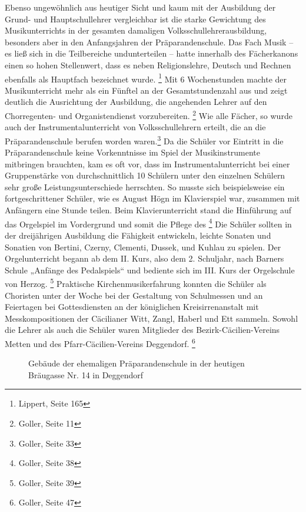 Ebenso ungewöhnlich aus heutiger Sicht und kaum mit der Ausbildung der
Grund- und Hauptschullehrer vergleichbar ist die starke Gewichtung des
Musikunterrichts in der gesamten damaligen Volksschullehrerausbildung,
besonders aber in den Anfangsjahren der Präparandenschule. Das Fach
Musik – es ließ sich in die Teilbereiche undunterteilen – hatte innerhalb des Fächerkanons einen so hohen
Stellenwert, dass es neben Religionslehre, Deutsch und Rechnen
ebenfalls als Hauptfach bezeichnet wurde. \footnote{Lippert, Seite 165}
Mit 6 Wochenstunden machte der Musikunterricht mehr als ein Fünftel an
der Gesamtstundenzahl aus und zeigt deutlich die Ausrichtung der
Ausbildung, die angehenden Lehrer auf den Chorregenten- und
Organistendienst vorzubereiten. \footnote{Goller, Seite 11} Wie alle
Fächer, so wurde auch der Instrumentalunterricht von Volksschullehrern
erteilt, die an die Präparandenschule berufen worden waren.\footnote{
Goller, Seite 33} Da die Schüler vor Eintritt in die Präparandenschule
keine Vorkenntnisse im Spiel der Musikinstrumente mitbringen brauchten,
kam es oft vor, dass im Instrumentalunterricht bei einer Gruppenstärke
von durchschnittlich 10 Schülern unter den einzelnen Schülern sehr
große Leistungsunterschiede herrschten. So musste sich beispielsweise
ein fortgeschrittener Schüler, wie es August Högn im Klavierspiel war,
zusammen mit Anfängern eine Stunde teilen. Beim Klavierunterricht stand
die Hinführung auf das Orgelspiel im Vordergrund und somit die Pflege
des   \footnote{Goller, Seite 38}
Die Schüler sollten in der dreijährigen Ausbildung die Fähigkeit
entwickeln, leichte Sonaten und Sonatien von Bertini, Czerny, Clementi,
Dussek, und Kuhlau zu spielen. Der Orgelunterricht begann ab dem II.
Kurs, also dem 2. Schuljahr, nach Barners Schule „Anfänge des
Pedalspiels“ und bediente sich im III. Kurs der Orgelschule von
Herzog. \footnote{Goller, Seite 39} Praktische Kirchenmusikerfahrung
konnten die Schüler als Choristen unter der Woche bei der Gestaltung
von Schulmessen und an Feiertagen bei Gottesdiensten an der königlichen
Kreisirrenanstalt mit Messkompositionen der Cäcilianer Witt, Zangl,
Haberl und Ett sammeln. Sowohl die Lehrer als auch die Schüler waren
Mitglieder des Bezirk-Cäcilien-Vereins Metten und des
Pfarr-Cäcilien-Vereins Deggendorf. \footnote{Goller, Seite 47}

\begin{figure}
\centering
{}
\caption{Gebäude der ehemaligen Präparandenschule in der heutigen
Bräugasse Nr. 14 in Deggendorf}
\end{figure}

